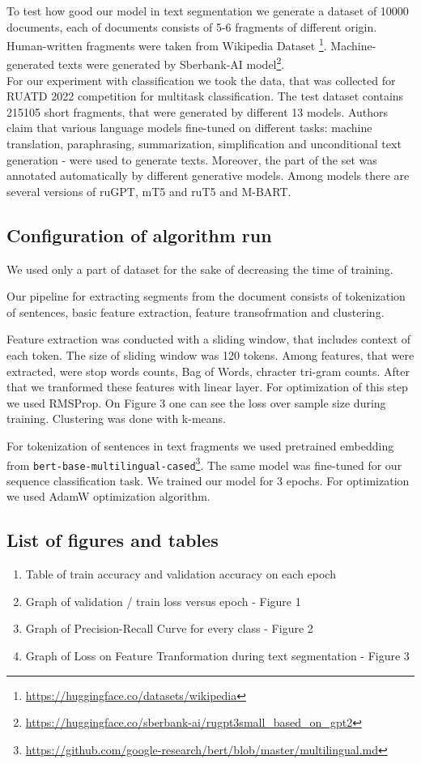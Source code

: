 \documentclass{article}
\begin{document}
To test how good our model in text segmentation we generate a dataset of 10000 documents, each of documents consists of 5-6 fragments of different origin. Human-written fragments were taken from Wikipedia Dataset \footnote{\url{https://huggingface.co/datasets/wikipedia}}. Machine-generated texts were generated by Sberbank-AI model\footnote{\url{https://huggingface.co/sberbank-ai/rugpt3small_based_on_gpt2}}. \\
For our experiment with classification we took the data, that was collected for RUATD 2022 competition\cite{ruatd-dataset} for multitask classification. The test dataset contains 215105 short fragments, that were generated by different 13 models. Authors claim that various language models fine-tuned on different tasks: machine translation, paraphrasing, summarization, simplification and unconditional text generation - were used to generate texts. Moreover, the part of the set was annotated automatically by different generative models. Among models there are several versions of ruGPT, mT5 and ruT5 and M-BART.

\subsection{Configuration of algorithm run}

We used only a part of dataset for the sake of decreasing the time of training. 

Our pipeline for extracting segments from the document consists of tokenization of sentences, basic feature extraction, feature transofrmation and clustering. 

Feature extraction was conducted with a sliding window, that includes context of each token. The size of sliding window was 120 tokens. Among features, that were extracted, were stop words counts, Bag of Words, chracter tri-gram counts. After that we tranformed these features with linear layer. For optimization of this step we used RMSProp. On Figure 3 one can see the loss over sample size during training. Clustering was done with k-means.


For tokenization of sentences in text fragments we used pretrained embedding from \texttt{bert-base-multilingual-cased}\footnote{\url{https://github.com/google-research/bert/blob/master/multilingual.md}}. The same model was fine-tuned for our sequence classification task. We trained our model for 3 epochs. For optimization we used AdamW optimization algorithm\cite{adam-w}.


\subsection{List of figures and tables}
\begin{enumerate}
    \item Table of train accuracy and validation accuracy on each epoch
    \item Graph of validation / train loss versus epoch - Figure 1
    \item Graph of Precision-Recall Curve for every class - Figure 2
    \item Graph of Loss on Feature Tranformation during text segmentation - Figure 3 
\end{enumerate}
\end{document}
